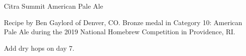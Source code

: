 \begin{recipe}{Citra Summit American Pale Ale}

\begin{aboutblock}
Recipe by Ben Gaylord of Denver, CO. Bronze medal in Category 10: American Pale
Ale during the 2019 National Homebrew Competition in Providence, RI.
\sourceaha
\end{aboutblock}


\begin{methodandtiming}
 
\begin{mashsteps}
\end{mashsteps}

\begin{fermentationsteps}
\end{fermentationsteps}

\begin{directions}
Add dry hops on day 7.
\end{directions}

\end{methodandtiming}

\recipebreak

\begin{ingredientsblock}

\begin{malts}
\end{malts}

\begin{hops}
\end{hops}


\end{ingredientsblock}

\end{recipe}


